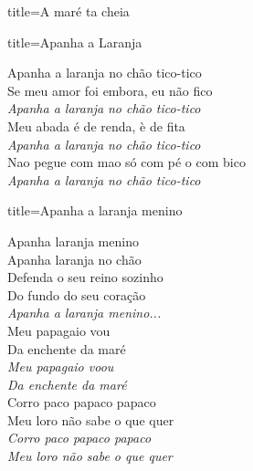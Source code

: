 \documentclass[fontsize=14pt, paper=a4, twoside, DIV=20]{scrreprt} %
\begin{document}
\begin{multicols*}{2}
\begin{song}{title={A maré ta cheia}}
\begin{verse*}
        \end{verse*}
\end{song}

\begin{song}{title={Apanha a Laranja}}

    \begin{verse*}
        Apanha a laranja no chão tico-tico\\
        Se meu amor foi embora, eu não fico\\

        \textit{Apanha a laranja} \textit{no chão tico-tico}\\
        Meu abada é de renda, è de fita\\
        \textit{Apanha a laranja} \textit{no chão tico-tico}\\
        Nao pegue com mao só com pé o com bico\\
        \textit{Apanha a laranja} \textit{no chão tico-tico} \\
    \end{verse*}

\end{song}


\columnbreak
\begin{song}{title={Apanha a laranja menino}}

    \begin{verse*}
        Apanha laranja menino\\
        Apanha laranja no chão\\
        Defenda o seu reino sozinho\\
        Do fundo do seu coração\\

        \textit{Apanha a laranja menino...}\\
        Meu papagaio vou\\
        Da enchente da maré\\
        \textit{Meu papagaio voou}\\
        \textit{Da enchente da maré}\\
        Corro paco papaco papaco\\
        Meu loro não sabe o que quer\\
        \textit{Corro paco papaco papaco}\\
        \textit{Meu loro não sabe o que quer}\\
    \end{verse*}
\end{song}


\end{multicols*}
\end{document}
